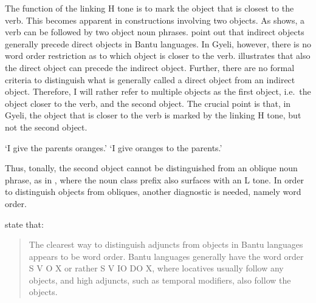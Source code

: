 The function of the linking H tone is to mark the object that is closest to the verb. This becomes apparent in constructions involving two objects. As  shows, a verb can be followed by two object noun phrases. \citet[279]{riedel2012} point out that indirect objects generally precede direct objects in Bantu languages. In Gyeli, however, there is no word order restriction as to which object is closer to the verb.   illustrates that also the direct object can precede the indirect object. Further, there are no formal criteria to distinguish what is generally called a direct object from an indirect object. Therefore, I will rather refer to multiple objects as the first object, i.e.\ the object closer to the verb, and the second object. The crucial point is that, in Gyeli, the object that is closer to the verb is marked by the linking H tone, but not the second object.

\ea\label{ncpre}
    \trans `I give the parents oranges.'
    \trans `I give oranges to the parents.'
\z
\z

\noindent Thus, tonally, the second object cannot be distinguished from an oblique noun phrase, as in , where the noun class prefix also surfaces with an L tone. In order to distinguish objects from obliques, another diagnostic is needed, namely word order.


\citet[279]{riedel2012} state that: \begin{quote}
The clearest way to distinguish adjuncts from objects in Bantu languages appears to be word order. Bantu languages generally have the word order S V O X or rather S V IO DO X, where locatives usually follow any objects, and high adjuncts, such as temporal modifiers, also follow the objects. \end{quote}

